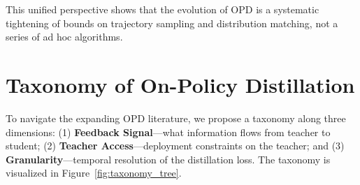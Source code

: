 \documentclass{article} %
\begin{document}
This unified perspective shows that the evolution of OPD is a systematic tightening of bounds on trajectory sampling and distribution matching, not a series of ad hoc algorithms.


\section{Taxonomy of On-Policy Distillation}
\label{sec:taxonomy}

To navigate the expanding OPD literature, we propose a taxonomy along three dimensions: (1) \textbf{Feedback Signal}---what information flows from teacher to student; (2) \textbf{Teacher Access}---deployment constraints on the teacher; and (3) \textbf{Granularity}---temporal resolution of the distillation loss. The taxonomy is visualized in Figure~\ref{fig:taxonomy_tree}.
\end{document}
